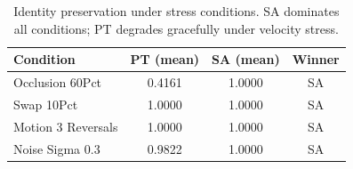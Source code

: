 \begin{table}[t]
\centering
\caption{Identity preservation under stress conditions. SA dominates all conditions; PT degrades gracefully under velocity stress.}
\label{tab:stress}
\begin{tabular}{lccc}
\toprule
Condition & PT (mean) & SA (mean) & Winner \\
\midrule
Occlusion 60Pct & 0.4161 & 1.0000 & SA \\
Swap 10Pct & 1.0000 & 1.0000 & SA \\
Motion 3 Reversals & 1.0000 & 1.0000 & SA \\
Noise Sigma 0.3 & 0.9822 & 1.0000 & SA \\
\bottomrule
\end{tabular}
\end{table}